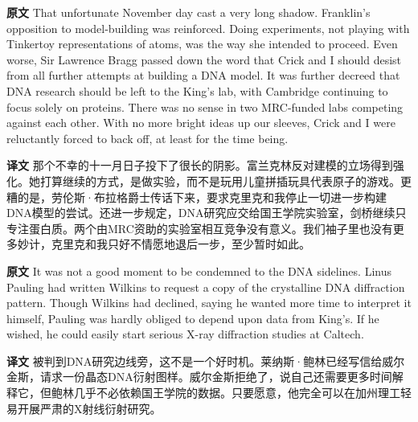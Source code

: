 \documentclass[UTF8,zihao=-4]{ctexart}
\newcommand{\BodyFont}{\fontsize{10.5pt}{15.5pt}\selectfont}
\renewenvironment{quote}{\par\noindent\begingroup\BodyFont}{\par\endgroup}
\begin{document}
\begin{quote}
\noindent\textbf{原文} That unfortunate November day cast a very long shadow. Franklin's opposition to model-building was reinforced. Doing experiments, not playing with Tinkertoy representations of atoms, was the way she intended to proceed. Even worse, Sir Lawrence Bragg passed down the word that Crick and I should desist from all further attempts at building a DNA model. It was further decreed that DNA research should be left to the King's lab, with Cambridge continuing to focus solely on proteins. There was no sense in two MRC-funded labs competing against each other. With no more bright ideas up our sleeves, Crick and I were reluctantly forced to back off, at least for the time being.

\smallskip
\noindent\textbf{译文} 那个不幸的十一月日子投下了很长的阴影。富兰克林反对建模的立场得到强化。她打算继续的方式，是做实验，而不是玩用儿童拼插玩具代表原子的游戏。更糟的是，劳伦斯·布拉格爵士传话下来，要求克里克和我停止一切进一步构建DNA模型的尝试。还进一步规定，DNA研究应交给国王学院实验室，剑桥继续只专注蛋白质。两个由MRC资助的实验室相互竞争没有意义。我们袖子里也没有更多妙计，克里克和我只好不情愿地退后一步，至少暂时如此。
\end{quote}

\begin{quote}
\noindent\textbf{原文} It was not a good moment to be condemned to the DNA sidelines. Linus Pauling had written Wilkins to request a copy of the crystalline DNA diffraction pattern. Though Wilkins had declined, saying he wanted more time to interpret it himself, Pauling was hardly obliged to depend upon data from King's. If he wished, he could easily start serious X-ray diffraction studies at Caltech.

\smallskip
\noindent\textbf{译文} 被判到DNA研究边线旁，这不是一个好时机。莱纳斯·鲍林已经写信给威尔金斯，请求一份晶态DNA衍射图样。威尔金斯拒绝了，说自己还需要更多时间解释它，但鲍林几乎不必依赖国王学院的数据。只要愿意，他完全可以在加州理工轻易开展严肃的X射线衍射研究。
\end{quote}
\end{document}
